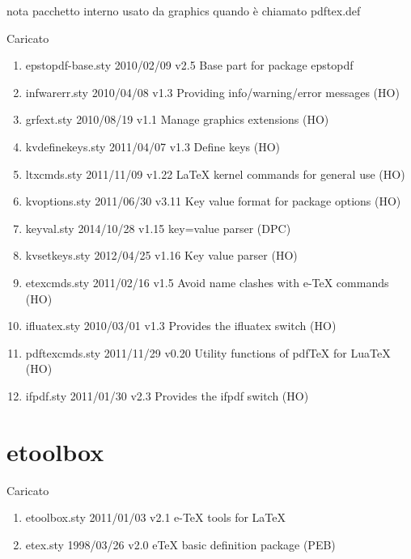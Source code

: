 nota pacchetto interno usato da graphics quando è chiamato pdftex.def

Caricato 
\begin{enumerate}
\item epstopdf-base.sty 2010/02/09 v2.5 Base part for package epstopdf
\item infwarerr.sty 2010/04/08 v1.3 Providing info/warning/error messages (HO)
\item grfext.sty 2010/08/19 v1.1 Manage graphics extensions (HO)
\item kvdefinekeys.sty 2011/04/07 v1.3 Define keys (HO)
\item ltxcmds.sty 2011/11/09 v1.22 LaTeX kernel commands for general use (HO)
\item kvoptions.sty 2011/06/30 v3.11 Key value format for package options (HO)
\item keyval.sty 2014/10/28 v1.15 key=value parser (DPC)
\item kvsetkeys.sty 2012/04/25 v1.16 Key value parser (HO)
\item etexcmds.sty 2011/02/16 v1.5 Avoid name clashes with e-TeX commands (HO)
\item ifluatex.sty 2010/03/01 v1.3 Provides the ifluatex switch (HO)
\item pdftexcmds.sty 2011/11/29 v0.20 Utility functions of pdfTeX for LuaTeX (HO)
\item ifpdf.sty 2011/01/30 v2.3 Provides the ifpdf switch (HO)
\end{enumerate}	
\section{etoolbox}

Caricato 
\begin{enumerate}
\item etoolbox.sty 2011/01/03 v2.1 e-TeX tools for LaTeX
\item etex.sty 1998/03/26 v2.0 eTeX basic definition package (PEB)
\end{enumerate}

